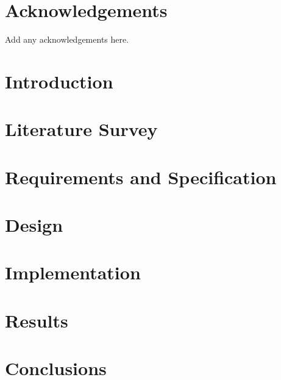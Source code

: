 
\maketitle
\newpage
\newpage


\declaration{\disstitle}{\authorname} %
\newpage


\abstract

\newpage


\tableofcontents
\newpage
\listoffigures
\newpage
\listoftables
\newpage

\chapter*{Acknowledgements}
Add any acknowledgements here.
\newpage

\listoftodos

\setcounter{page}{1}



\chapter{Introduction}

\chapter{Literature Survey}


\chapter{Requirements and Specification}


\chapter{Design}


\chapter{Implementation}


\chapter{Results}


\chapter{Conclusions}




\appendix




